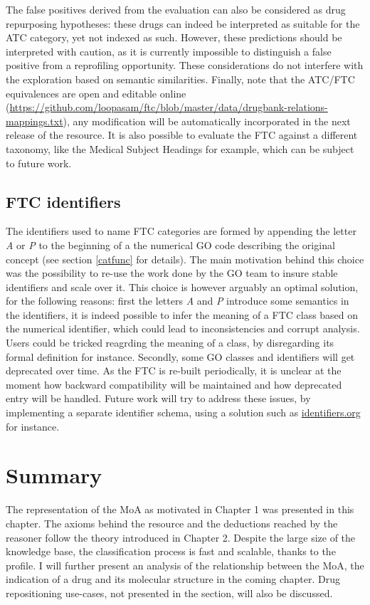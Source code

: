 The false positives derived from the evaluation can also be considered as drug repurposing hypotheses: these drugs can indeed be interpreted as suitable for the ATC category, yet not indexed as such. However, these predictions should be interpreted with caution, as it is currently impossible to distinguish a false positive from a reprofiling opportunity. These considerations do not interfere with the exploration based on semantic similarities. Finally, note that the ATC/FTC equivalences are open and editable online (\url{https://github.com/loopasam/ftc/blob/master/data/drugbank-relations-mappings.txt}), any modification will be automatically incorporated in the next release of the resource. It is also possible to evaluate the FTC against a different taxonomy, like the Medical Subject Headings for example, which can be subject to future work.

\subsection{FTC identifiers}
\label{sec:identifiers}

The identifiers used to name FTC categories are formed by appending the letter \emph{A} or \emph{P} to the beginning of a the numerical GO code describing the original concept (see section \ref{catfunc} for details). The main motivation behind this choice was the possibility to re-use the work done by the GO team to insure stable identifiers and scale over it. This choice is however arguably an optimal solution, for the following reasons: first the letters \emph{A} and \emph{P} introduce some semantics in the identifiers, it is indeed possible to infer the meaning of a FTC class based on the numerical identifier, which could lead to inconsistencies and corrupt analysis. Users could be tricked reagrding the meaning of a class, by disregarding its formal definition for instance. Secondly, some GO classes and identifiers will get deprecated over time. As the FTC is re-built periodically, it is unclear at the moment how backward compatibility will be maintained and how deprecated entry will be handled. Future work will try to address these issues, by implementing a separate identifier schema, using a solution such as \url{identifiers.org} \citep{juty2012identifiers} for instance.

\section{Summary}
The representation of the MoA as motivated in Chapter 1 was presented in this chapter. The axioms behind the resource and the deductions reached by the reasoner follow the theory introduced in Chapter 2. Despite the large size of the knowledge base, the classification process is fast and scalable, thanks to the  profile. I will further present an analysis of the relationship between the MoA, the indication of a drug and its molecular structure in the coming chapter. Drug repositioning use-cases, not presented in the section, will also be discussed.

